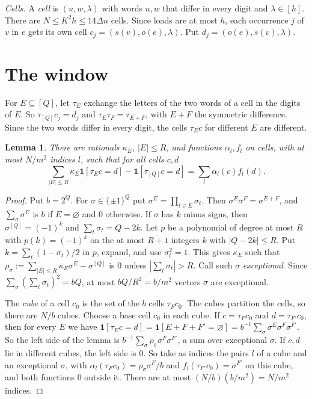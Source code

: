 \documentclass[10pt]{article}
\newtheorem{lemma}{Lemma}
\begin{document}
\emph{Cells.} A \emph{cell} is $(u,w,\lambda)$ with words $u,w$ that differ in every digit and $\lambda\in[h]$. There are $N\le K^2h\le14\Delta n$ cells. Since loads are at most $h$, each occurrence $j$ of $v$ in $e$ gets its own cell $c_j=(s(v),o(e),\lambda)$. Put $d_j=(o(e),s(v),\lambda)$.

\section{The window}

For $E\subseteq[Q]$, let $\tau_E$ exchange the letters of the two words of a cell in the digits of $E$. So $\tau_{[Q]}c_j=d_j$ and $\tau_E\tau_F=\tau_{E+F}$, with $E+F$ the symmetric difference. Since the two words differ in every digit, the cells $\tau_Ec$ for different $E$ are different.

\begin{lemma}\label{lem:window}
There are rationals $\kappa_E$, $|E|\le R$, and functions $\alpha_l,f_l$ on cells, with at most $N/m^2$ indices $l$, such that for all cells $c,d$
\[
\sum_{|E|\le R}\kappa_E\mathbf 1[\tau_Ec=d]-\mathbf 1[\tau_{[Q]}c=d]=\sum_l\alpha_l(c)f_l(d).
\]
\end{lemma}
\begin{proof}
Put $b=2^Q$. For $\sigma\in\{\pm1\}^Q$ put $\sigma^E=\prod_{t\in E}\sigma_t$. Then $\sigma^E\sigma^F=\sigma^{E+F}$, and $\sum_\sigma\sigma^E$ is $b$ if $E=\varnothing$ and $0$ otherwise. If $\sigma$ has $k$ minus signs, then $\sigma^{[Q]}=(-1)^k$ and $\sum_t\sigma_t=Q-2k$. Let $p$ be a polynomial of degree at most $R$ with $p(k)=(-1)^k$ on the at most $R+1$ integers $k$ with $|Q-2k|\le R$. Put $k=\sum_t(1-\sigma_t)/2$ in $p$, expand, and use $\sigma_t^2=1$. This gives $\kappa_E$ such that $\rho_\sigma:=\sum_{|E|\le R}\kappa_E\sigma^E-\sigma^{[Q]}$ is $0$ unless $|\sum_t\sigma_t|>R$. Call such $\sigma$ \emph{exceptional}. Since $\sum_\sigma(\sum_t\sigma_t)^2=bQ$, at most $bQ/R^2=b/m^2$ vectors $\sigma$ are exceptional.

The \emph{cube} of a cell $c_0$ is the set of the $b$ cells $\tau_Fc_0$. The cubes partition the cells, so there are $N/b$ cubes. Choose a base cell $c_0$ in each cube. If $c=\tau_Fc_0$ and $d=\tau_{F'}c_0$, then for every $E$ we have $\mathbf 1[\tau_Ec=d]=\mathbf 1[E+F+F'=\varnothing]=b^{-1}\sum_\sigma\sigma^E\sigma^F\sigma^{F'}$. So the left side of the lemma is $b^{-1}\sum_\sigma\rho_\sigma\sigma^F\sigma^{F'}$, a sum over exceptional $\sigma$. If $c,d$ lie in different cubes, the left side is $0$. So take as indices the pairs $l$ of a cube and an exceptional $\sigma$, with $\alpha_l(\tau_Fc_0)=\rho_\sigma\sigma^F/b$ and $f_l(\tau_{F'}c_0)=\sigma^{F'}$ on this cube, and both functions $0$ outside it. There are at most $(N/b)(b/m^2)=N/m^2$ indices.
\end{proof}
\end{document}
